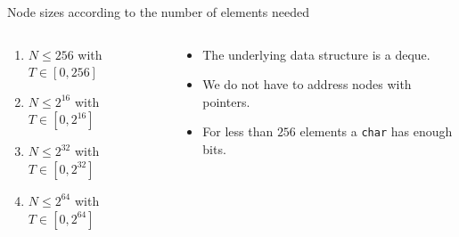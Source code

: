 \documentclass[10pt,aspectratio=169]{beamer}
\def\nodeU{\node[style=nodeU]}
\def\nodeD{\node[style=nodeD]}
\def\nodeQ{\node[style=nodeQ]}
\def\nodeO{\node[style=nodeO]}
\def\valueU{\node[style=valueU]}
\def\valueD{\node[style=valueD]}
\def\valueQ{\node[style=valueQ]}
\def\valueO{\node[style=valueO]}
\begin{document}
\begin{frame}[transparent]{Node sizes according to the number of elements needed}
\begin{columns}
\begin{column}{0.5\textwidth}
\begin{enumerate}
\item<alert@1> $N \le 256$ with $T \in [0, 256]$
\item<alert@2> $N \le 2^{16}$ with $T \in [0, 2^{16}]$
\item<alert@3> $N \le 2^{32}$ with $T \in [0, 2^{32}]$
\item<alert@4> $N \le 2^{64}$ with $T \in [0, 2^{64}]$
\end{enumerate}


\end{column}
\begin{column}{0.5\textwidth}

\begin{itemize}
\item The underlying data structure is a deque.
\item We do not have to address nodes with pointers.
\item For less than $256$ elements a \texttt{char} has enough bits.
\end{itemize}

\end{column}
\end{columns}

\end{frame}
\end{document}
